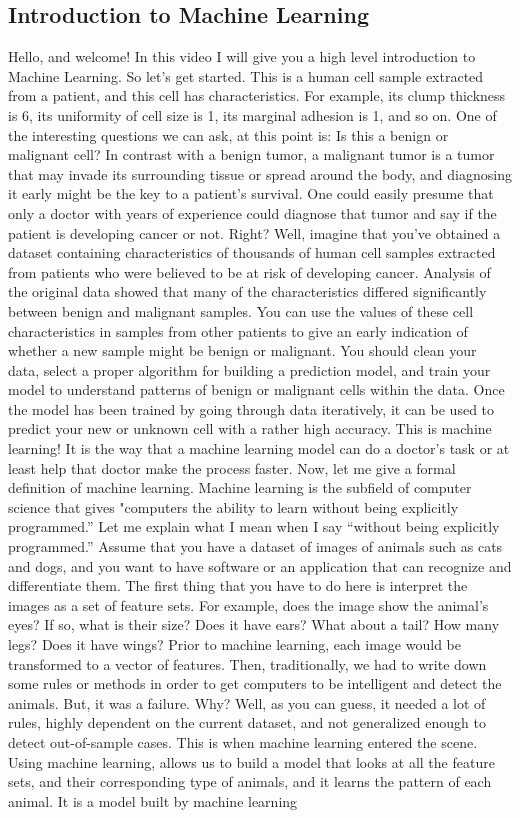 	\subsection{Introduction to Machine Learning}	
	
	Hello, and welcome! In this video I will give you a high level introduction to Machine Learning. So let’s get started. This is a human cell sample extracted from a patient, and this cell has characteristics. For example, its clump thickness is 6, its uniformity of cell size is 1, its marginal adhesion is 1, and so on. One of the interesting questions we can ask, at this point is: Is this a benign or malignant cell? In contrast with a benign tumor, a malignant tumor is a tumor that may invade its surrounding tissue or spread around the body, and diagnosing it early might be the key to a patient’s survival. One could easily presume that only a doctor with years of experience could diagnose that tumor and say if the patient is developing cancer or not. Right? Well, imagine that you’ve obtained a dataset containing characteristics of thousands of human cell samples extracted from patients who were believed to be at risk of developing cancer. Analysis of the original data showed that many of the characteristics differed significantly between benign and malignant samples. You can use the values of these cell characteristics in samples from other patients to give an early indication of whether a new sample might be benign or malignant. You should clean your data, select a proper algorithm for building a prediction model, and train your model to understand patterns of benign or malignant cells within the data. Once the model has been trained by going through data iteratively, it can be used to predict your new or unknown cell with a rather high accuracy. This is machine learning! It is the way that a machine learning model can do a doctor’s task or at least help that doctor make the process faster. Now, let me give a formal definition of machine learning. Machine learning is the subfield of computer science that gives "computers the ability to learn without being explicitly programmed.” Let me explain what I mean when I say “without being explicitly programmed.” Assume that you have a dataset of images of animals such as cats and dogs, and you want to have software or an application that can recognize and differentiate them. The first thing that you have to do here is interpret the images as a set of feature sets. For example, does the image show the animal’s eyes? If so, what is their size? Does it have ears? What about a tail? How many legs? Does it have wings? Prior to machine learning, each image would be transformed to a vector of features. Then, traditionally, we had to write down some rules or methods in order to get computers to be intelligent and detect the animals. But, it was a failure. Why? Well, as you can guess, it needed a lot of rules, highly dependent on the current dataset, and not generalized enough to detect out-of-sample cases. This is when machine learning entered the scene. Using machine learning, allows us to build a model that looks at all the feature sets, and their corresponding type of animals, and it learns the pattern of each animal. It is a model built by machine learning 